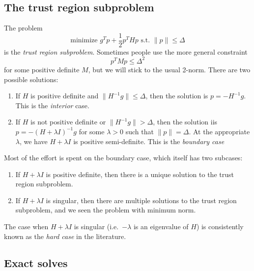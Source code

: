 \documentclass[12pt, leqno]{article} %
\providecommand{\tightlist}{%
  \setlength{\itemsep}{0pt}\setlength{\parskip}{0pt}}
\begin{document}
\subsection{The trust region subproblem}

The problem
\[\mbox{minimize } g^T p + \frac{1}{2} p^T H p \mbox{ s.t. } \|p\| \leq \Delta\]
is the \emph{trust region subproblem}. Sometimes people use the more
general constraint \[p^T M p \leq \Delta^2\] for some positive definite
\(M\), but we will stick to the usual 2-norm. There are two possible
solutions:

\begin{enumerate}
\def\labelenumi{\arabic{enumi}.}
\tightlist
\item
  If \(H\) is positive definite and \(\|H^{-1} g\| \leq \Delta\), then
  the solution is \(p = -H^{-1} g\). This is the \emph{interior} case.
\item
  If \(H\) is not positive definite or \(\|H^{-1} g\| > \Delta\), then
  the solution iis \(p = -(H+\lambda I)^{-1} g\) for some
  \(\lambda > 0\) such that \(\|p\| = \Delta\). At the appropriate
  \(\lambda\), we have \(H+\lambda I\) is positive semi-definite. This
  is the \emph{boundary case}
\end{enumerate}

Most of the effort is spent on the boundary case, which itself has two
subcases:

\begin{enumerate}
\def\labelenumi{\arabic{enumi}.}
\tightlist
\item
  If \(H + \lambda I\) is positive definite, then there is a unique
  solution to the trust region subproblem.
\item
  If \(H + \lambda I\) is singular, then there are multiple solutions to
  the trust region subproblem, and we seen the problem with minimum
  norm.
\end{enumerate}

The case when \(H + \lambda I\) is singular (i.e.~\(-\lambda\) is an
eigenvalue of \(H\)) is consistently known as the \emph{hard case} in
the literature.

\subsection{Exact solves}
\end{document}
